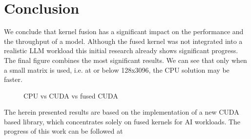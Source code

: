 \documentclass[letterpaper]{article}
\begin{document}
\section{Conclusion}

We conclude that kernel fusion has a significant impact on the performance and the throughput of a model. Although the fused kernel was not integrated into a realistic LLM workload this initial research already shows significant progress. The final figure combines the most significant results. We can see that only when a small matrix is used, i.e. at or below 128x3096, the CPU solution may be faster. 

\begin{figure}
\caption{CPU vs CUDA vs fused CUDA}
\label{cudaGelu}
\end{figure}


The herein presented results are based on the implementation of a new CUDA based library, which concentrates solely on fused kernels for AI workloads. The progress of this work can be followed at 





 
\end{document}
